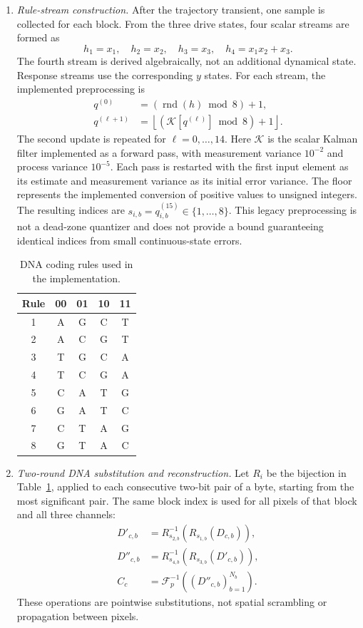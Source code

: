 \documentclass[a4paper,fleqn]{cas-dc}
\theoremstyle{plain}
\theoremstyle{definition}
\begin{document}
\begin{enumerate}
\item \textit{Rule-stream construction.}
After the trajectory transient, one sample is collected for each block. From the three drive states, four scalar streams are formed as
\begin{equation}
h_1=x_1,\quad h_2=x_2,\quad h_3=x_3,\quad h_4=x_1x_2+x_3.
\end{equation}
The fourth stream is derived algebraically, not an additional dynamical state. Response streams use the corresponding $y$ states. For each stream, the implemented preprocessing is
\begin{align}
q^{(0)}&=(\operatorname{rnd}(h)\bmod8)+1,\\
q^{(\ell+1)}&=\left\lfloor
(\mathcal K[q^{(\ell)}]\bmod8)+1\right\rfloor.
\end{align}
The second update is repeated for $\ell=0,\ldots,14$. Here $\mathcal K$ is the scalar Kalman filter implemented as a forward pass, with measurement variance $10^{-2}$ and process variance $10^{-5}$. Each pass is restarted with the first input element as its estimate and measurement variance as its initial error variance. The floor represents the implemented conversion of positive values to unsigned integers. The resulting indices are $s_{i,b}=q_{i,b}^{(15)}\in\{1,\ldots,8\}$. This legacy preprocessing is not a dead-zone quantizer and does not provide a bound guaranteeing identical indices from small continuous-state errors.

\begin{table}[pos=htbp]
\centering
\caption{DNA coding rules used in the implementation.}
\label{tab:dna_rules}
\begin{tabular}{c|cccc}
\hline
Rule & 00 & 01 & 10 & 11 \\
\hline
1 & A & G & C & T \\
2 & A & C & G & T \\
3 & T & G & C & A \\
4 & T & C & G & A \\
5 & C & A & T & G \\
6 & G & A & T & C \\
7 & C & T & A & G \\
8 & G & T & A & C \\
\hline
\end{tabular}
\end{table}

\item \textit{Two-round DNA substitution and reconstruction.}
Let $R_i$ be the bijection in Table~\ref{tab:dna_rules}, applied to each consecutive two-bit pair of a byte, starting from the most significant pair. The same block index is used for all pixels of that block and all three channels:
\begin{align}
D'_{c,b}&=R_{s_{2,b}}^{-1}(R_{s_{1,b}}(D_{c,b})),\\
D''_{c,b}&=R_{s_{4,b}}^{-1}(R_{s_{3,b}}(D'_{c,b})),\\
C_c&=\mathcal F_p^{-1}((D''_{c,b})_{b=1}^{N_b}).
\end{align}
These operations are pointwise substitutions, not spatial scrambling or propagation between pixels.
\end{enumerate}
\end{document}
